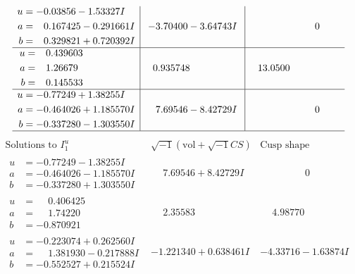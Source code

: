 \documentclass[1p]{elsarticle_modified}
\theoremstyle{definition}
\newcommand{\I}{\sqrt{-1}}
\begin{document}
$$\begin{array}{c|c|c}
\begin{aligned}
u &= -0.03856 - 1.53327 I \\
a &= \phantom{-}0.167425 - 0.291661 I \\
b &= \phantom{-}0.329821 + 0.720392 I\end{aligned}
 & -3.70400 - 3.64743 I & \phantom{-0.000000 } 0 \\ \hline\begin{aligned}
u &= \phantom{-}0.439603\phantom{ +0.000000I} \\
a &= \phantom{-}1.26679\phantom{ +0.000000I} \\
b &= \phantom{-}0.145533\phantom{ +0.000000I}\end{aligned}
 & \phantom{-}0.935748\phantom{ +0.000000I} & \phantom{-}13.0500\phantom{ +0.000000I} \\ \hline\begin{aligned}
u &= -0.77249 + 1.38255 I \\
a &= -0.464026 + 1.185570 I \\
b &= -0.337280 - 1.303550 I\end{aligned}
 & \phantom{-}7.69546 - 8.42729 I & \phantom{-0.000000 } 0\\
 \hline 
 \end{array}$$\newpage$$\begin{array}{c|c|c}  
\text{Solutions to }I^u_{1}& \I (\text{vol} + \sqrt{-1}CS) & \text{Cusp shape}\\
 \hline 
\begin{aligned}
u &= -0.77249 - 1.38255 I \\
a &= -0.464026 - 1.185570 I \\
b &= -0.337280 + 1.303550 I\end{aligned}
 & \phantom{-}7.69546 + 8.42729 I & \phantom{-0.000000 } 0 \\ \hline\begin{aligned}
u &= \phantom{-}0.406425\phantom{ +0.000000I} \\
a &= \phantom{-}1.74220\phantom{ +0.000000I} \\
b &= -0.870921\phantom{ +0.000000I}\end{aligned}
 & \phantom{-}2.35583\phantom{ +0.000000I} & \phantom{-}4.98770\phantom{ +0.000000I} \\ \hline\begin{aligned}
u &= -0.223074 + 0.262560 I \\
a &= \phantom{-}1.381930 - 0.217888 I \\
b &= -0.552527 + 0.215524 I\end{aligned}
 & -1.221340 + 0.638461 I & -4.33716 - 1.63874 I \\ \hline\begin{aligned}

\end{aligned}
\end{array}$$
\end{document}
